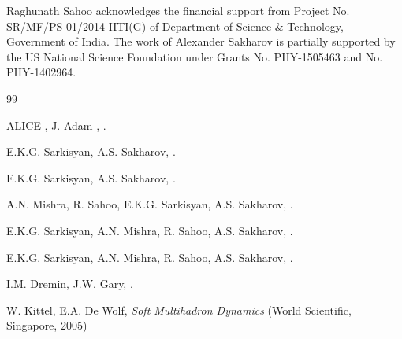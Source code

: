 \documentclass[twocolumn,showpacs,preprintnumbers,prd,superscriptaddress,nofootinbib]{revtex4}
\begin{document}
 Raghunath Sahoo acknowledges the financial support from
Project No. SR/MF/PS-01/2014-IITI(G) of Department of Science \& 
Technology, Government of India.
  The work of Alexander Sakharov is partially supported by the US National 
Science Foundation under Grants No. PHY-1505463 and No. PHY-1402964.



\begin{thebibliography}{99}

 ALICE \col, J. Adam \ea,  .


 E.K.G. Sarkisyan, A.S. Sakharov, 
 . 

 E.K.G. Sarkisyan, A.S. Sakharov, 
 .

 A.N. Mishra, R. Sahoo, E.K.G. Sarkisyan, A.S. Sakharov,  
  . 

  E.K.G. Sarkisyan, A.N. Mishra, R. Sahoo, A.S. Sakharov,
  . 

 E.K.G. Sarkisyan, A.N. Mishra, R. Sahoo, A.S. Sakharov,
 . 

 I.M. Dremin, J.W. Gary, .

  W. Kittel, E.A. De Wolf, {\it Soft Multihadron Dynamics}
 (World Scientific, Singapore,  2005)


\end{thebibliography}
\end{document}
